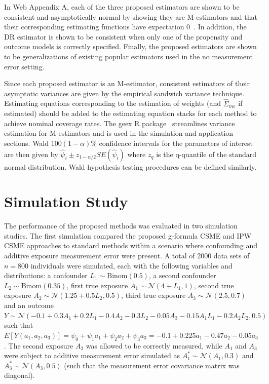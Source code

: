 \documentclass[useAMS,usenatbib,referee]{biom}
\begin{document}
In Web Appendix A, each of the three proposed estimators are shown to be consistent and asymptotically normal by showing they are M-estimators and that their corresponding estimating functions have expectation 0~\citep{stefanski2002}. In addition, the DR estimator is shown to be consistent when only one of the propensity and outcome models is correctly specified. Finally, the proposed estimators are shown to be generalizations of existing popular estimators used in the no measurement error setting.

Since each proposed estimator is an M-estimator, consistent estimators of their asymptotic variances are given by the empirical sandwich variance technique. Estimating equations corresponding to the estimation of weights (and $\hat{\Sigma}_{me}$ if estimated) should be added to the estimating equation stacks for each method to achieve nominal coverage rates. The geex R package~\citep{saul2017} streamlines variance estimation for M-estimators and is used in the simulation and application sections. Wald $100(1-\alpha)\%$ confidence intervals for the parameters of interest are then given by $\hat{\psi}_{i} \pm z_{1-\alpha/2} SE(\hat{\psi}_{i})$ where $z_q$ is the q-quantile of the standard normal distribution. Wald hypothesis testing procedures can be defined similarly.

\section{Simulation Study}

The performance of the proposed methods was evaluated in two simulation studies. The first simulation compared the proposed g-formula CSME and IPW CSME approaches to standard methods within a scenario where confounding and additive exposure measurement error were present. A total of 2000 data sets of $n = 800$ individuals were simulated, each with the following variables and distributions: a confounder $L_{1} \sim \text{Binom}(0.5)$, a second confounder $L_{2} \sim \text{Binom}(0.35)$, first true exposure $A_{1} \sim \mathcal{N}(4 + L_{1}, 1)$, second true exposure $A_{2} \sim \mathcal{N}(1.25 + 0.5L_{2}, 0.5)$, third true exposure $A_{3} \sim \mathcal{N}(2.5, 0.7)$ and an outcome $Y \sim \mathcal{N}(-0.1 + 0.3A_{1} + 0.2L_{1} - 0.4A_{2} - 0.3L_{2} - 0.05A_{3} - 0.15A_{1}L_{1} - 0.2A_{2}L_{2}, 0.5)$ such that $E[Y(a_{1}, a_{2}, a_{3})] = \psi_{0} + \psi_{1}a_{1} + \psi_{2}a_{2} + \psi_{3}a_{3} = -0.1 + 0.225a_{1} - 0.47a_{2} - 0.05a_{3}$. The second exposure $A_{2}$ was allowed to be correctly measured, while $A_{1}$ and $A_{3}$ were subject to additive measurement error simulated as $A_{1}^{*} \sim \mathcal{N}(A_{1}, 0.3)$ and $A_{3}^{*} \sim \mathcal{N}(A_{3}, 0.5)$ (such that the measurement error covariance matrix was diagonal).
\end{document}
